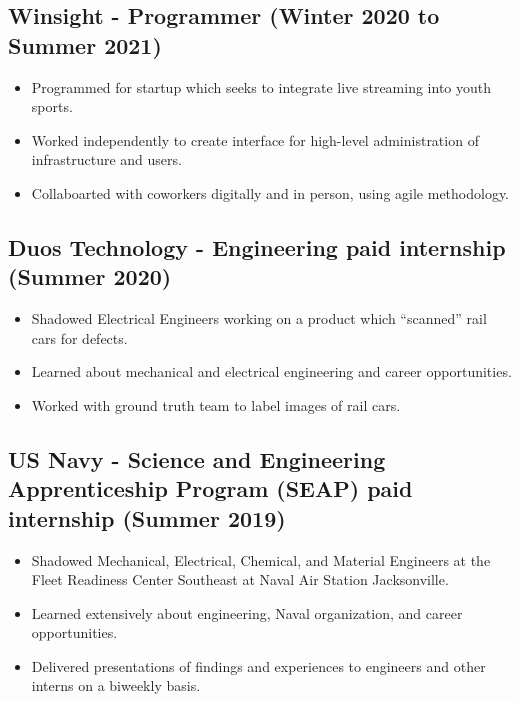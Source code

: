 \documentclass{article}
\newenvironment{CustomItemize}
{ \begin{itemize}[leftmargin=1em]
    \setlength{\itemsep}{0pt}
    \setlength{\parskip}{0pt}
    \setlength{\parindent}{0pt}
    \setlength{\parsep}{0pt}     }
{ \end{itemize}                  }
\begin{document}
\subsection{Winsight - Programmer (Winter 2020 to Summer 2021)}
\begin{CustomItemize}
\item Programmed for startup which seeks to integrate live streaming into youth sports.
\item Worked independently to create interface for high-level administration of infrastructure and users.
\item Collaboarted with coworkers digitally and in person, using agile methodology.
\end{CustomItemize}

\subsection{Duos Technology - Engineering paid internship (Summer 2020)}
\begin{CustomItemize}
\item Shadowed Electrical Engineers working on a product which ``scanned'' rail cars for defects.
\item Learned about mechanical and electrical engineering and career opportunities.
\item Worked with ground truth team to label images of rail cars.
\end{CustomItemize}

\subsection{US Navy - Science and Engineering Apprenticeship Program (SEAP) paid internship (Summer 2019)}
\begin{CustomItemize}
\item Shadowed Mechanical, Electrical, Chemical, and Material Engineers at the Fleet Readiness Center Southeast at Naval Air Station Jacksonville.
\item Learned extensively about engineering, Naval organization, and career opportunities.
\item Delivered presentations of findings and experiences to engineers and other interns on a biweekly basis.
\end{CustomItemize}
\end{document}
